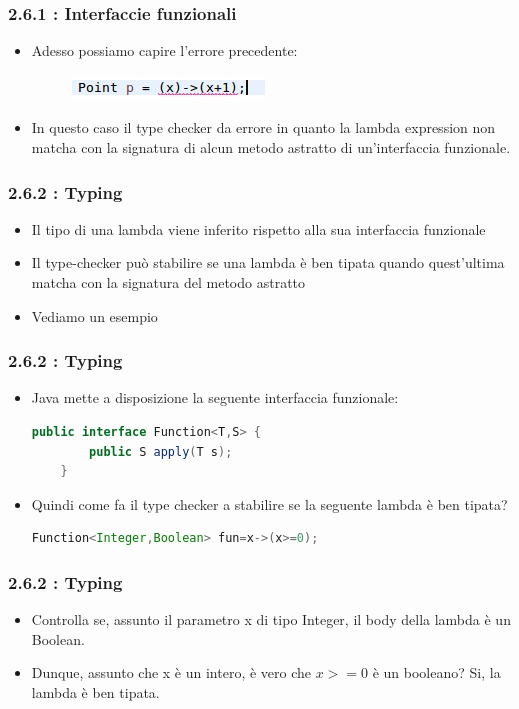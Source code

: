\documentclass{beamer}
\begin{document}
\begin{frame}
\frametitle{\textbf{2.6.1 : Interfaccie funzionali}}
\begin{itemize}
	\item Adesso possiamo capire l'errore precedente:
	\begin{figure}
		\centering
		\includegraphics[width=0.3\linewidth]{target}
		\label{fig:target}
	\end{figure}
	\item In questo caso il type checker da errore in quanto la lambda expression non matcha con la signatura di alcun metodo astratto di un'interfaccia funzionale.
\end{itemize}
\end{frame}

\begin{frame}
\frametitle{\textbf{2.6.2 : Typing}}
\begin{itemize}
	\item Il tipo di una lambda viene inferito rispetto alla sua interfaccia funzionale
	\item Il type-checker pu\`o stabilire se una lambda \`e ben tipata quando quest'ultima matcha con la signatura del metodo astratto
	\item Vediamo un esempio
\end{itemize}
\end{frame}

\begin{frame}[fragile]
\frametitle{\textbf{2.6.2 : Typing}}
\begin{itemize}
	\item Java mette a disposizione la seguente interfaccia funzionale:
	\begin{lstlisting}[language=Java]
	public interface Function<T,S> {
		public S apply(T s);
	}
	\end{lstlisting}
	\item Quindi come fa il type checker a stabilire se la seguente lambda è ben tipata?
	\begin{lstlisting}[language=Java]
	Function<Integer,Boolean> fun=x->(x>=0);
	\end{lstlisting}
\end{itemize}
\end{frame}

\begin{frame}[fragile]
\frametitle{\textbf{2.6.2 : Typing}}
\begin{itemize}
	\item Controlla se, assunto il parametro x di tipo Integer, il body della lambda è un Boolean.
	\item Dunque, assunto che x è un intero, è vero che $x>=0$ è un booleano? Si, la lambda è ben tipata.
\end{itemize}
\end{frame}
\end{document}
